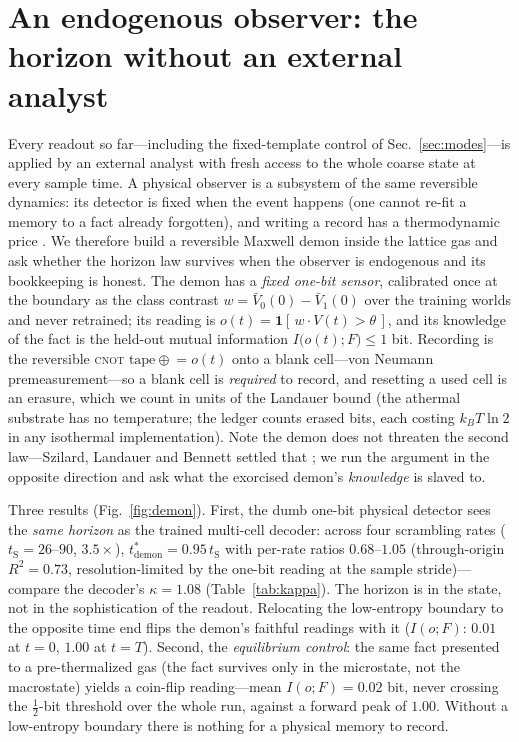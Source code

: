 \documentclass[aps,pre,twocolumn,superscriptaddress,nofootinbib,longbibliography]{revtex4-2}
\newcommand{\tS}{t_{\mathrm{S}}}
\newcommand{\tstar}{t^{*}}
\newcommand{\kap}{\kappa}
\begin{document}
\section{An endogenous observer: the horizon without an external analyst}
\label{sec:demon}

Every readout so far---including the fixed-template control of Sec.~\ref{sec:modes}---is
applied by an external analyst with fresh access to the whole coarse state at every sample
time. A physical observer is a subsystem of the same reversible dynamics: its detector is
fixed when the event happens (one cannot re-fit a memory to a fact already forgotten), and
writing a record has a thermodynamic price
\cite{szilard1929,landauer1961,bennett1982,parrondo2015}. We therefore build a reversible
Maxwell demon inside the lattice gas and ask whether the horizon law survives when the
observer is endogenous and its bookkeeping is honest. The demon has a \emph{fixed one-bit
sensor}, calibrated once at the boundary as the class contrast
$w=\bar V_0(0)-\bar V_1(0)$ over the training worlds and never retrained; its reading is
$o(t)=\mathbf{1}[\,w\cdot V(t)>\theta\,]$, and its knowledge of the fact is the held-out
mutual information $I\bigl(o(t);F\bigr)\le1$ bit. Recording is the reversible \textsc{cnot}
$\text{tape}\oplus\!=o(t)$ onto a blank cell---von Neumann premeasurement---so a blank cell
is \emph{required} to record, and resetting a used cell is an erasure, which we count in
units of the Landauer bound (the athermal substrate has no temperature; the ledger counts
erased bits, each costing $k_BT\ln2$ in any isothermal implementation). Note the demon does
not threaten the second law---Szilard, Landauer and Bennett settled that
\cite{szilard1929,landauer1961,bennett1982}; we run the argument in the opposite direction
and ask what the exorcised demon's \emph{knowledge} is slaved to.

Three results (Fig.~\ref{fig:demon}). First, the dumb one-bit physical detector sees the
\emph{same horizon} as the trained multi-cell decoder: across four scrambling rates
($\tS=26$--$90$, $3.5\times$), $\tstar_{\mathrm{demon}}=0.95\,\tS$ with per-rate ratios
$0.68$--$1.05$ (through-origin $R^2=0.73$, resolution-limited by the one-bit reading at the
sample stride)---compare the decoder's $\kap=1.08$ (Table~\ref{tab:kappa}). The horizon is
in the state, not in the sophistication of the readout. Relocating the low-entropy boundary
to the opposite time end flips the demon's faithful readings with it
($I(o;F)$: $0.01$ at $t=0$, $1.00$ at $t=T$). Second, the \emph{equilibrium control}: the
same fact presented to a pre-thermalized gas (the fact survives only in the microstate, not
the macrostate) yields a coin-flip reading---mean $I(o;F)=0.02$ bit, never crossing the
$\tfrac12$-bit threshold over the whole run, against a forward peak of $1.00$. Without a
low-entropy boundary there is nothing for a physical memory to record.
\end{document}
